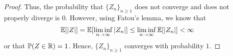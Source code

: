 \begin{proof}
    Thus, the probability that $\{Z_{n}\}_{n \geq 1}$ does not converge and does not properly diverge is $0$. However, using Fatou's lemma, we know that
    \begin{align}
        \mathbb{E}[\left| Z \right|] = \mathbb{E}[\liminf_{n \to \infty} \left| Z_{n} \right|] \leq \liminf_{n \to \infty} \mathbb{E}[\left| Z_{n} \right|] < \infty
    \end{align}
    or that $\mathbb{P}(Z \in \mathbb{R}) = 1$. Hence, $\{Z_{n}\}_{n \geq 1}$ converges with probability $1$.
\end{proof}